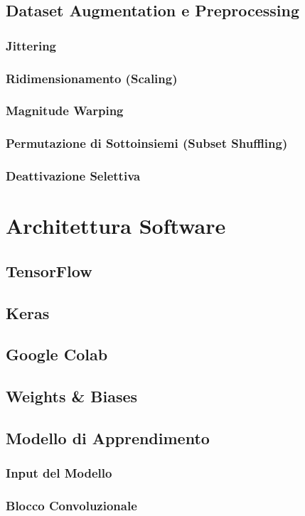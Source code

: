 \documentclass[12pt]{report}
\begin{document}
\section{Dataset Augmentation e Preprocessing}
\subsection{Jittering}
\subsection{Ridimensionamento (Scaling)}
\subsection{Magnitude Warping}
\subsection{Permutazione di Sottoinsiemi (Subset Shuffling)}
\subsection{Deattivazione Selettiva}


\chapter{Architettura Software}
\section{TensorFlow}
\section{Keras}
\section{Google Colab}
\section{Weights \& Biases}
\section{Modello di Apprendimento}
\subsection{Input del Modello}
\subsection{Blocco Convoluzionale}
\end{document}
